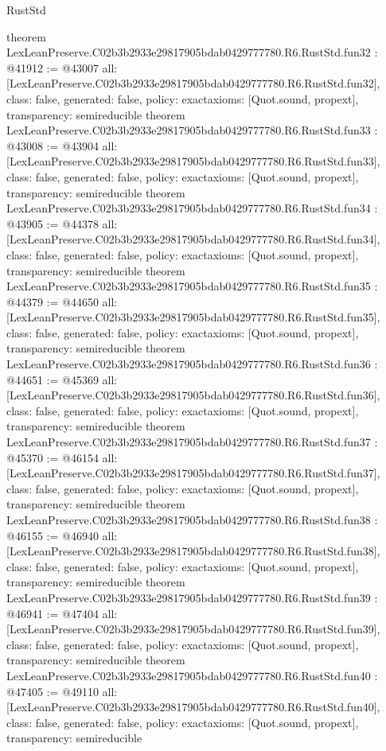 \begin{lexlean}{RustStd}
\begin{coremodule}
{}
theorem LexLeanPreserve.C02b3b2933e29817905bdab0429777780.R6.RustStd.fun32 : @41912 := @43007 {
  all: [LexLeanPreserve.C02b3b2933e29817905bdab0429777780.R6.RustStd.fun32],
  class: false,
  generated: false,
  policy: exact{axioms: [Quot.sound, propext]},
  transparency: semireducible
}
theorem LexLeanPreserve.C02b3b2933e29817905bdab0429777780.R6.RustStd.fun33 : @43008 := @43904 {
  all: [LexLeanPreserve.C02b3b2933e29817905bdab0429777780.R6.RustStd.fun33],
  class: false,
  generated: false,
  policy: exact{axioms: [Quot.sound, propext]},
  transparency: semireducible
}
theorem LexLeanPreserve.C02b3b2933e29817905bdab0429777780.R6.RustStd.fun34 : @43905 := @44378 {
  all: [LexLeanPreserve.C02b3b2933e29817905bdab0429777780.R6.RustStd.fun34],
  class: false,
  generated: false,
  policy: exact{axioms: [Quot.sound, propext]},
  transparency: semireducible
}
theorem LexLeanPreserve.C02b3b2933e29817905bdab0429777780.R6.RustStd.fun35 : @44379 := @44650 {
  all: [LexLeanPreserve.C02b3b2933e29817905bdab0429777780.R6.RustStd.fun35],
  class: false,
  generated: false,
  policy: exact{axioms: [Quot.sound, propext]},
  transparency: semireducible
}
theorem LexLeanPreserve.C02b3b2933e29817905bdab0429777780.R6.RustStd.fun36 : @44651 := @45369 {
  all: [LexLeanPreserve.C02b3b2933e29817905bdab0429777780.R6.RustStd.fun36],
  class: false,
  generated: false,
  policy: exact{axioms: [Quot.sound, propext]},
  transparency: semireducible
}
theorem LexLeanPreserve.C02b3b2933e29817905bdab0429777780.R6.RustStd.fun37 : @45370 := @46154 {
  all: [LexLeanPreserve.C02b3b2933e29817905bdab0429777780.R6.RustStd.fun37],
  class: false,
  generated: false,
  policy: exact{axioms: [Quot.sound, propext]},
  transparency: semireducible
}
theorem LexLeanPreserve.C02b3b2933e29817905bdab0429777780.R6.RustStd.fun38 : @46155 := @46940 {
  all: [LexLeanPreserve.C02b3b2933e29817905bdab0429777780.R6.RustStd.fun38],
  class: false,
  generated: false,
  policy: exact{axioms: [Quot.sound, propext]},
  transparency: semireducible
}
theorem LexLeanPreserve.C02b3b2933e29817905bdab0429777780.R6.RustStd.fun39 : @46941 := @47404 {
  all: [LexLeanPreserve.C02b3b2933e29817905bdab0429777780.R6.RustStd.fun39],
  class: false,
  generated: false,
  policy: exact{axioms: [Quot.sound, propext]},
  transparency: semireducible
}
theorem LexLeanPreserve.C02b3b2933e29817905bdab0429777780.R6.RustStd.fun40 : @47405 := @49110 {
  all: [LexLeanPreserve.C02b3b2933e29817905bdab0429777780.R6.RustStd.fun40],
  class: false,
  generated: false,
  policy: exact{axioms: [Quot.sound, propext]},
  transparency: semireducible
}
\end{coremodule}
\end{lexlean}
